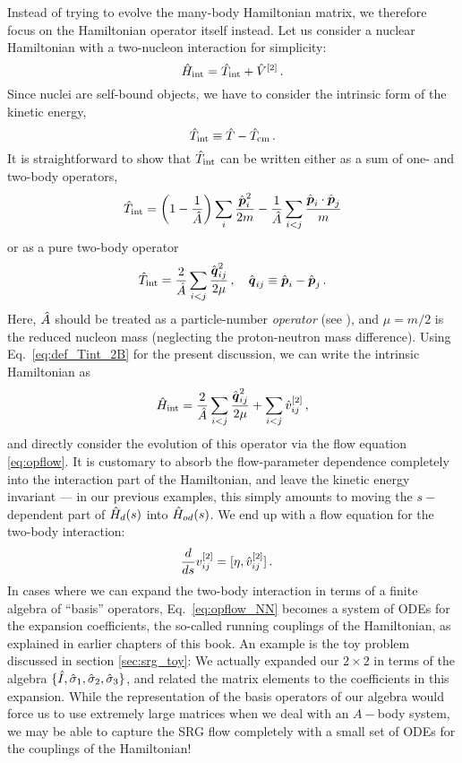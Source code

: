 Instead of trying to evolve the many-body Hamiltonian matrix, we therefore focus
on the Hamiltonian operator itself instead. Let us consider a nuclear Hamiltonian 
with a two-nucleon interaction for simplicity:
\begin{equation}
  \hat{H}_\text{int} = \hat{T}_\text{int} + \hat{V}^{[2]}\,.
\end{equation}
Since nuclei are self-bound objects, we have to consider the intrinsic form of the 
kinetic energy, 
\begin{equation}
  \hat{T}_\text{int} \equiv \hat{T} - \hat{T}_\text{cm}\,.
\end{equation}
It is straightforward to show that $\hat{T}_\text{int}$ can be written either as a sum of
one- and two-body operators,
\begin{equation}\label{eq:def_Tint_1B2B}
  \Tint= \left(1-\frac{1}{\AO}\right)\sum_{i}\frac{\pOV_i^2}{2m} - \frac{1}{\AO}\sum_{i<j}\frac{\pOV_{i}\cdot\pOV_{j}}{m}
\end{equation}
or as a pure two-body operator
\begin{equation}\label{eq:def_Tint_2B}
  \Tint= \frac{2}{\AO}\sum_{i<j}\frac{\qOV_{ij}^2}{2\mu}\,,\quad \qOV_{ij}\equiv\pOV_{i}-\pOV_{j}\,.
\end{equation}
Here, $\hat{A}$ should be treated as a particle-number \emph{operator} (see \cite{Hergert:2009wh}),
and $\mu=m/2$ is the reduced nucleon mass (neglecting the proton-neutron mass difference).
Using Eq.~\eqref{eq:def_Tint_2B} for the present discussion, we can write the intrinsic 
Hamiltonian as
\begin{equation}\label{eq:def_Hint_2B}
  \Hint = \frac{2}{\AO}\sum_{i<j}\frac{\qOV_{ij}^2}{2\mu} + \sum_{i<j}\vO^{[2]}_{ij}\,,
\end{equation}
and directly consider the evolution of this operator via the flow equation
\eqref{eq:opflow}. It is customary to absorb the flow-parameter dependence 
completely into the interaction part of the Hamiltonian, and leave the kinetic
energy invariant --- in our previous examples, this simply amounts to moving the
$s-$dependent part of $\hat{H}_d(s)$ into $\hat{H}_{od}(s)$. We end up with a flow equation 
for the two-body interaction:
\begin{align}\label{eq:opflow_NN}
  \totd{}{s}v^{[2]}_{ij} &= \comm{\eta}{\vO^{[2]}_{ij}}\,.
\end{align}
In cases where we can expand the two-body interaction in terms of a finite algebra of
``basis'' operators, Eq.~\eqref{eq:opflow_NN} becomes a system of ODEs for the expansion 
coefficients, the so-called running couplings of the Hamiltonian, as explained
in earlier chapters of this book. An example is the toy problem discussed in section 
\ref{sec:srg_toy}: We actually expanded our $2\times2$ in terms of the algebra 
$\{\hat{I},\hat{\sigma}_{1},\hat{\sigma}_{2},\hat{\sigma}_{3}\}$,
and related the matrix elements to the coefficients in this expansion. While 
the representation of the basis operators of our algebra would force us to use
extremely large matrices when we deal with an $A-$body system, we may be able
to capture the SRG flow completely with a small set of ODEs for the couplings 
of the Hamiltonian!

